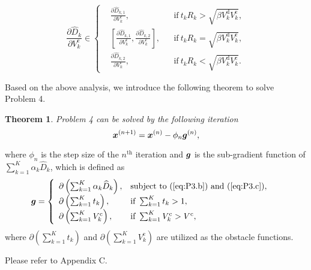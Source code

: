 \documentclass[journal,draftcls,onecolumn,12pt,twoside]{IEEEtran}
\newcommand{\bm}[1]{\mbox{\boldmath{$#1$}}}
\newtheorem{thm}{Theorem}
\begin{document}
\begin{equation}
    \dfrac{\partial \widehat{D}_k}{\partial V_k^{\text{c}}} \in
    \left\{
    \begin{aligned}
        & \frac{\partial \widehat{D}_{k,1}}{\partial V_k^{\text{c}}},
            & &\text{if}~t_k R_k > \sqrt{\beta V_k^{\text{d}} V_k^{\text{c}}}, \\
        & \left[\frac{\partial \widehat{D}_{k,1}}{\partial V_k^{\text{c}}}, \frac{\partial \widehat{D}_{k,2}}{\partial V_k^{\text{c}}}\right],
            & &\text{if}~t_k R_k = \sqrt{\beta V_k^{\text{d}} V_k^{\text{c}}}, \\
        & \frac{\partial \widehat{D}_{k,2}}{\partial V_k^{\text{c}}},
            & &\text{if}~t_k R_k < \sqrt{\beta V_k^{\text{d}} V_k^{\text{c}}}.
	\end{aligned}
    \right. \label{26}
\end{equation}

Based on the above analysis, we introduce the following theorem to solve Problem 4.
\begin{thm}
Problem 4 can be solved by the following iteration
\begin{equation}
	{\bm{x}}^{(n+1)} = {\bm{x}}^{(n)}-\phi_n {\bm{g}}^{(n)}, \label{27}
\end{equation}
\end{thm}		
where $\phi_n$ is the step size of the $n^{\text{th}}$ iteration and $\bm{g}$ is the sub-gradient function of $\sum_{k=1}^K \alpha_k \widehat{D}_k$, which is defined as
\begin{align}
	{\bm{g}} &=
    \left\{
	\begin{array}{ll}
		\partial\left(\sum_{k=1}^{K}\alpha_k \widehat{D}_k \right), &\text{subject to}~ \text{(\ref{eq:P3.b})}~\text{and}~\text{(\ref{eq:P3.c})},\\
		\partial\left(\sum_{k=1}^{K}t_k\right),&\text{if}~\sum_{k=1}^{K}t_k>1,\\
		\partial\left(\sum_{k=1}^{K}V_k^{\text{c}}\right),&\text{if}~\sum_{k=1}^{K}V_k^{\text{c}}>V^{\text{c}},
	\end{array}
	\right.\label{28}
\end{align}
where $\partial\left(\sum_{k=1}^{K}t_k\right)$ and $\partial\left(\sum_{k=1}^{K}V_k^{\text{c}}\right)$ are utilized as the obstacle functions.
\begin{IEEEproof}
	Please refer to Appendix C.
\end{IEEEproof}
\end{document}
